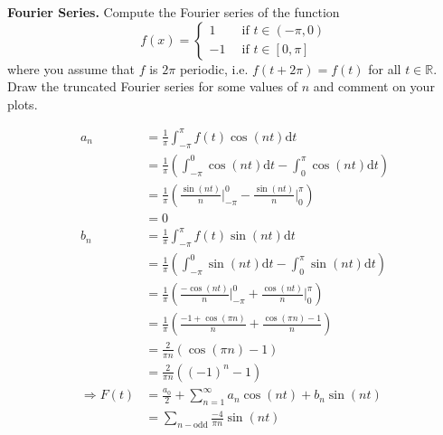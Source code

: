\textbf{Fourier Series.} Compute the Fourier series of the
function
\[
f(x) = \left\{
\begin{aligned}
 1 &\,\,\, \text{if}\,\, t \in (-\pi, 0) \\
-1 &\,\,\, \text{if}\,\, t \in [0, \pi]
\end{aligned}
\right.
\]
where you assume that $f$ is $2\pi$ periodic, i.e. $f(t+2\pi) = f(t)$
for all $t \in \mathbb{R}$. Draw the truncated Fourier series for some
values of $n$ and comment on your plots.


{\color{blue}

\[
\begin{aligned}
a_n &= \frac{1}{\pi} \int_{-\pi}^{\pi} f(t) \cos(n t) \textrm{d}t \\
&= \frac{1}{\pi} \left(\int_{-\pi}^0 \cos(nt) \textrm{d}t -
\int_0^{\pi} \cos(nt) \textrm{d}t \right) \\
&= \frac{1}{\pi} \left( \frac{\sin(nt)}{n} \bigg|_{-\pi}^0 -
\frac{\sin(nt)}{n} \bigg|_0^{\pi} \right) \\
&= 0 \\
b_n &= \frac{1}{\pi} \int_{-\pi}^{\pi} f(t) \sin(n t) \textrm{d}t \\
&= \frac{1}{\pi} \left(\int_{-\pi}^0 \sin(nt) \textrm{d}t -
\int_0^{\pi} \sin(nt) \textrm{d}t \right) \\
&= \frac{1}{\pi} \left( \frac{-\cos(nt)}{n} \bigg|_{-\pi}^0 +
\frac{\cos(nt)}{n} \bigg|_0^{\pi} \right) \\
&= \frac{1}{\pi} \left(
\frac{-1 + \cos(\pi n)}{n}
+ \frac{\cos(\pi n) - 1}{n}
 \right) \\
&= \frac{2}{\pi n} \left(
 \cos(\pi n) - 1
 \right) \\
&= \frac{2}{\pi n} \left(
 (-1)^n - 1
 \right) \\
\Rightarrow F(t) &= \frac{a_0}{2} + \sum_{n=1}^\infty a_n \cos(n t) +
b_n \sin(n t) \\
&= \sum_{n-\textrm{odd}} \frac{-4}{\pi n} \sin(n t)
\end{aligned}
\]
}
